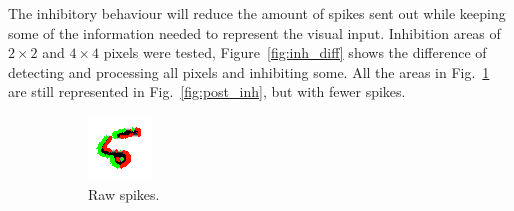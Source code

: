 \documentclass[twocolumn]{article}
\begin{document}


The inhibitory behaviour will reduce the amount of spikes sent out while keeping some of the information needed to represent the visual input. Inhibition areas of $2\times 2$ and $4\times 4$ pixels were tested, Figure~\ref{fig:inh_diff} shows the difference of detecting and processing all pixels and inhibiting some. All the areas in Fig.~\ref{fig:pre_inh} are still represented in Fig.~\ref{fig:post_inh}, but with fewer spikes.
\begin{figure}[htb]
  \captionsetup[subfigure]{justification=centering}
  \centering
  \begin{subfigure}[b]{0.23\textwidth}
    \includegraphics[width=\textwidth]{pre_inh_frame_262}
    \caption{Raw spikes.}
    \label{fig:pre_inh}
  \end{subfigure}
  ~
  \begin{subfigure}[b]{0.23\textwidth}

\end{subfigure}
\end{figure}
\end{document}
